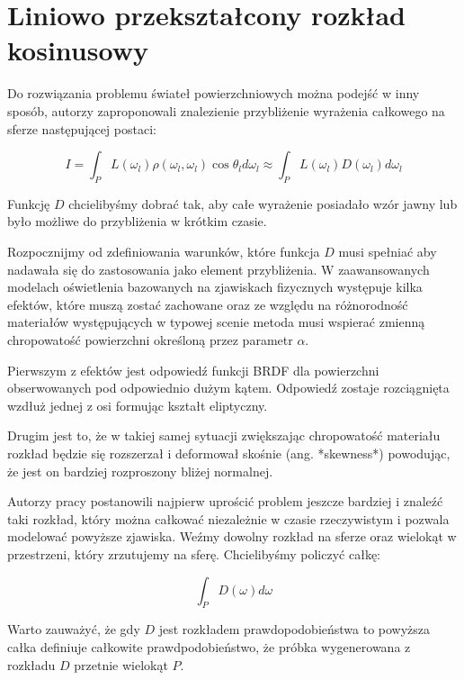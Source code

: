 \documentclass[../main.tex]{subfiles}
\begin{document}
\section{Liniowo przekształcony rozkład kosinusowy}

Do rozwiązania problemu świateł powierzchniowych można podejść w inny sposób,
autorzy \cite{ltc_heitz} zaproponowali znalezienie przybliżenie wyrażenia
całkowego na sferze następującej postaci:

\begin{displaymath}
I = \int_{P} {
  L(\omega_l)
  \rho(\omega_l, \omega_l)
  \cos \theta_l
  d \omega_l
}
\approx
\int_{P} {
  L(\omega_l)
  D(\omega_l)
  d \omega_l
}
\end{displaymath}

Funkcję $D$ chcielibyśmy dobrać tak, aby całe wyrażenie posiadało wzór jawny
lub było możliwe do przybliżenia w krótkim czasie.

Rozpocznijmy od zdefiniowania warunków, które funkcja $D$ musi spełniać aby
nadawała się do zastosowania jako element przybliżenia. W zaawansowanych
modelach oświetlenia bazowanych na zjawiskach fizycznych występuje kilka
efektów, które muszą zostać zachowane oraz ze względu na różnorodność
materiałów występujących w typowej scenie metoda musi wspierać zmienną
chropowatość powierzchni określoną przez parametr $\alpha$.

Pierwszym z efektów jest odpowiedź funkcji BRDF dla powierzchni obserwowanych
pod odpowiednio dużym kątem. Odpowiedź zostaje rozciągnięta wzdłuż jednej z
osi formując kształt eliptyczny.

Drugim jest to, że w takiej samej sytuacji zwiększając chropowatość materiału
rozkład będzie się rozszerzał i deformował skośnie (ang. *skewness*) powodując,
że jest on bardziej rozproszony bliżej normalnej.

Autorzy pracy \cite{ltc_heitz} postanowili najpierw uprościć problem jeszcze
bardziej i znaleźć taki rozkład, który można całkować niezależnie w czasie
rzeczywistym i pozwala modelować powyższe zjawiska. Weźmy dowolny rozkład na
sferze oraz wielokąt  w przestrzeni, który zrzutujemy na sferę. Chcielibyśmy
policzyć całkę:

\begin{displaymath}
\int_P {
  D(\omega)
  d \omega
}
\end{displaymath}

Warto zauważyć, że gdy $D$ jest rozkładem prawdopodobieństwa to powyższa całka
definiuje całkowite prawdpodobieństwo, że próbka wygenerowana z rozkładu $D$
przetnie wielokąt $P$.
\end{document}

